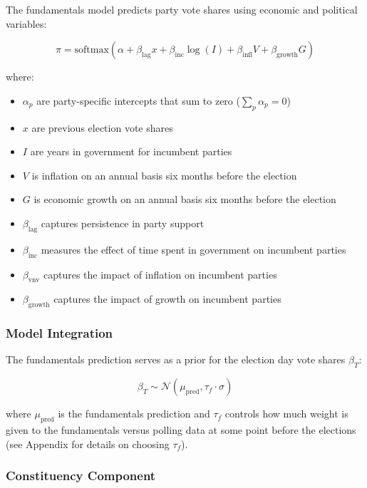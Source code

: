 \documentclass[
  letterpaper,
  DIV=11,
  numbers=noendperiod]{scrartcl}
\providecommand{\tightlist}{%
  \setlength{\itemsep}{0pt}\setlength{\parskip}{0pt}}\usepackage{longtable,booktabs,array}
\begin{document}
The fundamentals model predicts party vote shares using economic and
political variables:

\[
\pi = \text{softmax}(\alpha + \beta_\text{lag}x + \beta_\text{inc}\log(I) + \beta_\text{infl}V + \beta_\text{growth}G)
\]

where:

\begin{itemize}
\tightlist
\item
  \(\alpha_p\) are party-specific intercepts that sum to zero
  (\(\sum_p \alpha_p = 0\))
\item
  \(x\) are previous election vote shares
\item
  \(I\) are years in government for incumbent parties
\item
  \(V\) is inflation on an annual basis six months before the election
\item
  \(G\) is economic growth on an annual basis six months before the
  election
\item
  \(\beta_\text{lag}\) captures persistence in party support
\item
  \(\beta_\text{inc}\) measures the effect of time spent in government
  on incumbent parties
\item
  \(\beta_\text{vnv}\) captures the impact of inflation on incumbent
  parties
\item
  \(\beta_\text{growth}\) captures the impact of growth on incumbent
  parties
\end{itemize}

\subsubsection{Model Integration}\label{model-integration}

The fundamentals prediction serves as a prior for the election day vote
shares \(\beta_T\):

\[
\beta_T \sim \mathcal{N}(\mu_\text{pred}, \tau_f \cdot \sigma)
\]

where \(\mu_\text{pred}\) is the fundamentals prediction and \(\tau_f\)
controls how much weight is given to the fundamentals versus polling
data at some point before the elections (see Appendix for details on
choosing \(\tau_f\)).

\subsubsection{Constituency Component}\label{constituency-component}
\end{document}

